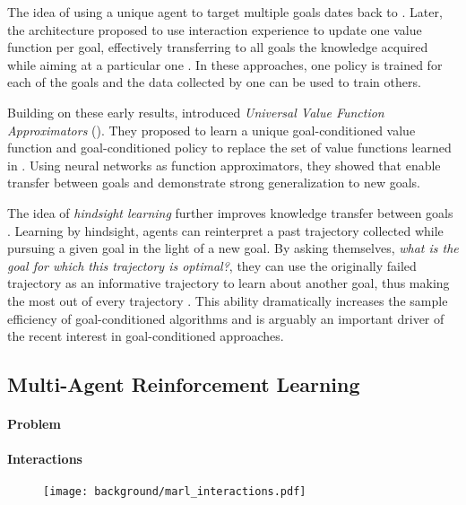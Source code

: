 The idea of using a unique \rl agent to target multiple goals dates back to \cite{kaelbling1993learning}. Later, the \horde architecture proposed to use interaction experience to update one value function per goal, effectively transferring to all goals the knowledge acquired while aiming at a particular one \cite{sutton2011horde}. In these approaches, one policy is trained for each of the goals and the data collected by one can be used to train others.

Building on these early results, \cite{schaul2015universal} introduced \textit{Universal Value Function Approximators} (\uvfa). They proposed to learn a unique goal-conditioned value function and goal-conditioned policy to replace the set of value functions learned in \horde. Using neural networks as function approximators, they showed that \uvfas enable transfer between goals and demonstrate strong generalization to new goals.

The idea of \textit{hindsight learning} further improves knowledge transfer between goals \cite{kaelbling1993learning,andrychowicz2017hindsight}. Learning by hindsight, agents can reinterpret a past trajectory collected while pursuing a given goal in the light of a new goal. By asking themselves, \textit{what is the goal for which this trajectory is optimal?}, they can use the originally failed trajectory as an informative trajectory to learn about another goal, thus making the most out of every trajectory \cite{eysenbach2020rewriting}. This ability dramatically increases the sample efficiency of goal-conditioned algorithms and is arguably an important driver of the recent interest in goal-conditioned \rl approaches.


\subsection{Multi-Agent Reinforcement Learning}

\paragraph{Problem}

\paragraph{Interactions}

\begin{figure}[!h]
\centering
\texttt{[image: background/marl\_interactions.pdf]}	
\caption{}
\label{fig:marl_interacvtions}
\end{figure}


